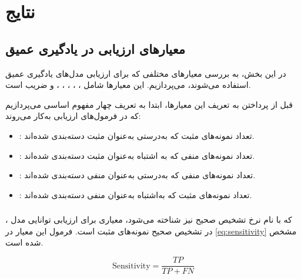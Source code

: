 \chapter{نتایج}
\section{معیارهای ارزیابی در یادگیری عمیق}

در این بخش، به بررسی معیارهای مختلفی که برای ارزیابی مدل‌های یادگیری عمیق استفاده می‌شوند، می‌پردازیم. این معیارها شامل ، ، ، ، ،  و ضریب  است.

قبل از پرداختن به تعریف این معیارها، ابتدا به تعریف چهار مفهوم اساسی می‌پردازیم که در فرمول‌های ارزیابی به‌کار می‌روند:

\begin{itemize}
    \item \textbf{ }: تعداد نمونه‌های مثبت که به‌درستی به‌عنوان مثبت دسته‌بندی شده‌اند.
    \item \textbf{ }: تعداد نمونه‌های منفی که به اشتباه به‌عنوان مثبت دسته‌بندی شده‌اند.
    \item \textbf{ }: تعداد نمونه‌های منفی که به‌درستی به‌عنوان منفی دسته‌بندی شده‌اند.
    \item \textbf{ }: تعداد نمونه‌های مثبت که به‌اشتباه به‌عنوان منفی دسته‌بندی شده‌اند.
\end{itemize}

\subsection{}

، که با نام نرخ تشخیص صحیح نیز شناخته می‌شود، معیاری برای ارزیابی توانایی مدل در تشخیص صحیح نمونه‌های مثبت است. فرمول این معیار در \autoref{eq:sensitivity} مشخص شده است.

\begin{latin}
\begin{equation}
\label{eq:sensitivity}
\text{Sensitivity} = \frac{TP}{TP + FN}
\end{equation}
\end{latin}

\subsection{}

